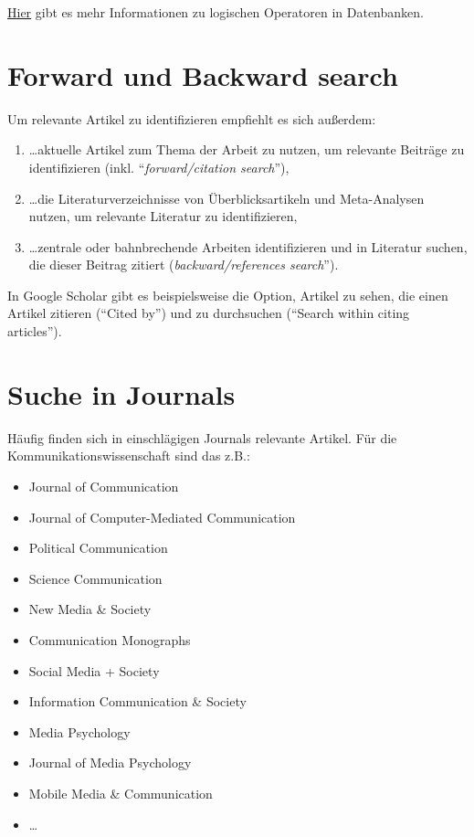 \documentclass[
  letterpaper,
  DIV=11]{scrreprt}
\providecommand{\tightlist}{%
  \setlength{\itemsep}{0pt}\setlength{\parskip}{0pt}}\usepackage{longtable,booktabs,array}
\begin{document}
\href{https://libguides.mit.edu/c.php?g=175963&p=1158594}{Hier} gibt es
mehr Informationen zu logischen Operatoren in Datenbanken.

\section{Forward und Backward search}\label{forward-und-backward-search}

Um relevante Artikel zu identifizieren empfiehlt es sich außerdem:

\begin{enumerate}
\def\labelenumi{\arabic{enumi}.}
\item
  \ldots aktuelle Artikel zum Thema der Arbeit zu nutzen, um relevante
  Beiträge zu identifizieren (inkl. ``\emph{forward/citation search}''),
\item
  \ldots die Literaturverzeichnisse von Überblicksartikeln und
  Meta-Analysen nutzen, um relevante Literatur zu identifizieren,
\item
  \ldots zentrale oder bahnbrechende Arbeiten identifizieren und in
  Literatur suchen, die dieser Beitrag zitiert
  (\emph{backward/references search}'').
\end{enumerate}

In Google Scholar gibt es beispielsweise die Option, Artikel zu sehen,
die einen Artikel zitieren (``Cited by'') und zu durchsuchen (``Search
within citing articles'').

\section{Suche in Journals}\label{suche-in-journals}

Häufig finden sich in einschlägigen Journals relevante Artikel. Für die
Kommunikationswissenschaft sind das z.B.:

\begin{itemize}
\tightlist
\item
  Journal of Communication
\item
  Journal of Computer-Mediated Communication
\item
  Political Communication
\item
  Science Communication
\item
  New Media \& Society
\item
  Communication Monographs
\item
  Social Media + Society
\item
  Information Communication \& Society
\item
  Media Psychology
\item
  Journal of Media Psychology
\item
  Mobile Media \& Communication
\item
  \ldots{}
\end{itemize}
\end{document}
